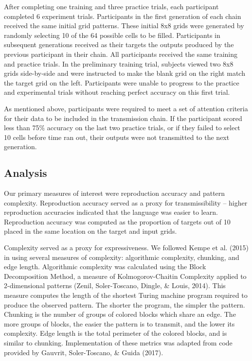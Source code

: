 \documentclass[10pt, letterpaper]{article}
\begin{document}
After completing one training and three practice trials, each
participant completed 6 experiment trials. Participants in the first
generation of each chain received the same initial grid patterns. These
initial 8x8 grids were generated by randomly selecting 10 of the 64
possible cells to be filled. Participants in subsequent generations
received as their targets the outputs produced by the previous
participant in their chain. All participants received the same training
and practice trials. In the preliminary training trial, subjects viewed
two 8x8 grids side-by-side and were instructed to make the blank grid on
the right match the target grid on the left. Participants were unable to
progress to the practice and experimental trials without reaching
perfect accuracy on this first trial.

As mentioned above, participants were required to meet a set of
attention criteria for their data to be included in the transmission
chain. If the participant scored less than 75\% accuracy on the last two
practice trials, or if they failed to select 10 cells before time ran
out, their outputs were not transmitted to the next generation.

\subsection{Analysis}\label{analysis}

Our primary measures of interest were reproduction accuracy and pattern
complexity. Reproduction accuracy served as a proxy for transmissibility
-- higher reproduction accuracies indicated that the language was easier
to learn. Reproduction accuracy was computed as the proportion of
targets out of 10 placed in the same location on the target and input
grids.

Complexity served as a proxy for expressiveness. We followed Kempe et
al. (2015) in using several measures of complexity: algorithmic
complexity, chunking, and edge length. Algorithmic complexity was
calculated using the Block Decomposition Method, a measure of
Kolmogorov-Chaitin Complexity applied to 2-dimensional patterns (Zenil,
Soler-Toscano, Dingle, \& Louis, 2014). This measure computes the length
of the shortest Turing machine program required to produce the observed
pattern. The shorter the program, the simpler the pattern. Chunking is
the number of groups of colored blocks which share an edge. The more
groups of blocks, the easier the pattern is to transmit, and the lower
its complexity. Edge length is the total perimeter of the colored
blocks, and is similar to chunking. Implementation of these metrics was
adapted from code provided by Gauvrit, Soler-Toscano, \& Guida (2017).
\end{document}

